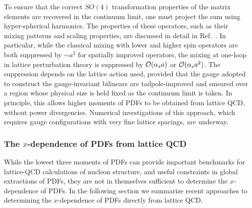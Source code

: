 To ensure that the correct $SO(4)$ transformation properties of the matrix 
elements are recovered in the continuum limit, one must project the sum using 
hyper-spherical harmonics.
%
The properties of these operators, such as their mixing patterns and scaling 
properties, are discussed in detail in Ref.~\cite{Davoudi:2012ya}.
%
In particular, while the classical mixing with lower and higher spin operators 
are both suppressed by $\sim a^2$ for spatially improved operators, the mixing 
at one-loop in lattice perturbation theory is suppressed 
by ${\cal O}(\alpha_s a)$ or ${\cal O}(\alpha_s a^2)$. 
%
The suppression depends on the lattice action used, provided that the gauge 
adopted to construct the gauge-invariant bilinears are tadpole-improved 
and smeared over a region whose physical size is held fixed as the continuum 
limit is taken. 
%
In principle, this allows higher moments of PDFs to be obtained from lattice 
QCD, without power divergencies. Numerical investigations of this approach,
which requires gauge configurations with very fine lattice spacings, are 
underway.

\subsubsection{The $x$-dependence of PDFs from lattice QCD}
\label{sec:xdependence}

While the lowest three moments of PDFs can provide important benchmarks for 
lattice-QCD calculations of nucleon structure, and useful constraints in global 
extractions of PDFs, they are not in themselves sufficient to determine the 
$x$-dependence of PDFs.
%
In the following section we summarize recent approaches to determining the 
$x$-dependence of PDFs directly from lattice QCD.

